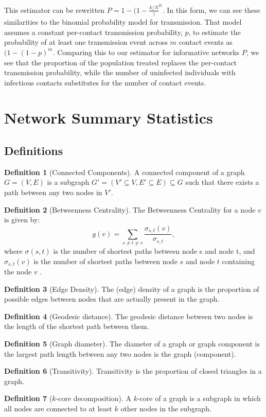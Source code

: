\documentclass{article}
\theoremstyle{definition}
\newtheorem{definition}{Definition}[section]
\begin{document}
This estimator can be rewritten $P=1-(1-\frac{k/N})^n$. In this form, we can see these similarities to the binomial probability model for transmission\cite{becker_general_1981}. That model assumes a constant per-contact transmission probability, $p$, to estimate the probability of at least one transmission event across $m$ contact events as $(1-(1-p)^m$. Comparing this to our estimator for informative networks $P$, we see that the proportion of the population treated replaces the per-contact transmission probability, while the number of uninfected individuals with infectious contacts substitutes for the number of contact events.

\newpage

\section{\textbf{Network Summary Statistics}}
\label {Appendix 2}
\subsection{Definitions}
\begin{definition}[Connected Components]
A connected component of a graph $G=(V,E)$ is a subgraph $G'=(V' \subseteq V,E' \subseteq E)\subseteq G$ such that there exists a path between any two nodes in $V'$.
\end{definition}
\begin{definition}[Betweenness Centrality]
The Betweenness Centrality for a node $v$ is given by: $$g(v)=\sum_{s\neq t\neq v}\frac{\sigma_{s,t}(v)}{\sigma_{s,t}},$$ where $\sigma(s,t)$ is  the number of shortest paths between node s and node t, and  $\sigma_{s,t}(v)$ is the number of shortest paths between node $s$ and node $t$ containing the node $v$ \cite{barabasi_network_2016}.
\end{definition}
\begin{definition}[Edge Density]
The (edge) density of a graph is the proportion of possible edges between nodes
that are actually present in the graph.
\end{definition}
\begin{definition}[Geodesic distance]
The geodesic distance between two nodes is the length of the shortest path between them.
\end{definition}
\begin{definition}[Graph diameter]
The diameter of a graph or graph component is the largest path length between any two nodes is the graph (component).
\end{definition}
\begin{definition}[Transitivity]
Transitivity is the proportion of closed triangles in a graph.
\end{definition}
\begin{definition}[$k$-core decomposition]
A $k$-core of a graph is a subgraph in which all nodes are connected to at least $k$ other nodes in the subgraph.
\end{definition}
\end{document}
